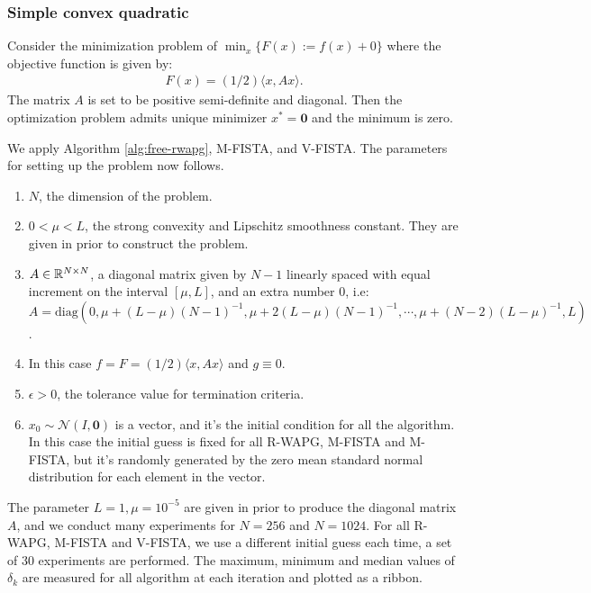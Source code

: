 \documentclass[12pt]{article}
\begin{document}
    \subsubsection{Simple convex quadratic}
        Consider the minimization problem of $\min_x \{F(x):= f(x) + 0\}$ where the objective function is given by: 
        \begin{align*}
            F(x) = (1/2)\langle x, A x\rangle. 
        \end{align*}
        The matrix $A$ is set to be positive semi-definite and diagonal. 
        Then the optimization problem admits unique minimizer $x^* = \mathbf 0$ and the minimum is zero. 
        \par
        We apply Algorithm \ref{alg:free-rwapg}, M-FISTA, and V-FISTA. 
        The parameters for setting up the problem now follows. 
        \begin{enumerate}
            \item $N$, the dimension of the problem. 
            \item $0 < \mu < L$, the strong convexity and Lipschitz smoothness constant. They are given in prior to construct the problem. 
            \item $A \in \mathbb R^{N\times N}$, a diagonal matrix given by $N- 1$ linearly spaced with equal increment on the interval $[\mu, L]$, and an extra number $0$, i.e: $A = \text{diag}(0, \mu + (L-\mu)(N - 1)^{-1}, \mu + 2(L-\mu)(N - 1)^{-1}, \cdots, \mu + (N - 2)(L - \mu)^{-1}, L)$. 
            \item In this case $f = F = (1/2)\langle x, A x\rangle$ and $g \equiv 0$. 
            \item $\epsilon > 0$, the tolerance value for termination criteria. 
            \item $x_0 \sim \mathcal N(I, \mathbf 0)$ is a vector, and it's the initial condition for all the algorithm. In this case the initial guess is fixed for all R-WAPG, M-FISTA and M-FISTA, but it's randomly generated by the zero mean standard normal distribution for each element in the vector. 
        \end{enumerate}
        The parameter $L=1, \mu=10^{-5}$ are given in prior to produce the diagonal matrix $A$, and we conduct many experiments for $N = 256$ and $N = 1024$. 
        For all R-WAPG, M-FISTA and V-FISTA, 
        we use a different initial guess each time, a set of 30 experiments are performed. 
        The maximum, minimum and median values of $\delta_k$ are measured for all algorithm at each iteration and plotted as a ribbon. 
\end{document}
